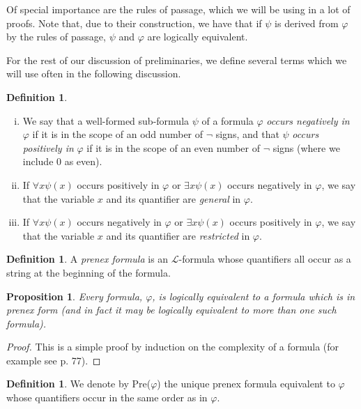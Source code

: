 \documentclass[a4paper,12pt]{report}
\newtheorem{prop}[lem]{Proposition}
\theoremstyle{definition}
\newtheorem{mydef}[lem]{Definition}
\begin{document}
Of special importance are the rules of passage, which we will be using in a lot of proofs. Note that, due to their construction, we have that if $\psi$ is derived from $\varphi$ by the rules of passage, $\psi$ and $\varphi$ are logically equivalent.

For the rest of our discussion of preliminaries, we define several terms which we will use often in the following discussion.

\begin{mydef}
\label{genres def}
\begin{enumerate}[(i)]
\item We say that a well-formed sub-formula $\psi$ of a formula $\varphi$ \emph{occurs negatively in} $\varphi$ if it is in the scope of an odd number of $\neg$ signs, and that $\psi$ \emph{occurs positively in} $\varphi$ if it is in the scope of an even number of $\neg$ signs (where we include $0$ as even).
\item If $\forall x \psi (x)$ occurs positively in $\varphi$ or $\exists x \psi (x)$  occurs negatively in $\varphi$, we say that the variable $x$ and its quantifier are \emph{general} in $\varphi$.
\item If $\forall x \psi (x)$ occurs negatively in $\varphi$ or $\exists x \psi (x)$ occurs positively in $\varphi$, we say that the variable $x$ and its quantifier are \emph{restricted} in $\varphi$.
\end{enumerate} 
\end{mydef}

\begin{mydef}
\label{prenex def}
A \emph{prenex formula} is an $\mathcal{L}$-formula whose quantifiers all occur as a string at the beginning of the formula.
\end{mydef}

\begin{prop}
\label{many pren}
Every formula, $\varphi$, is logically equivalent to a formula which is in prenex form (and in fact it may be logically equivalent to more than one such formula). 
\end{prop}
\begin{proof}
This is a simple proof by induction on the complexity of a formula (for example see \cite{jhdiss} p. 77).
\end{proof}

\begin{mydef}
We denote by Pre($\varphi$) the unique prenex formula equivalent to $\varphi$ whose quantifiers occur in the same order as in $\varphi$.
\end{mydef}
\end{document}
